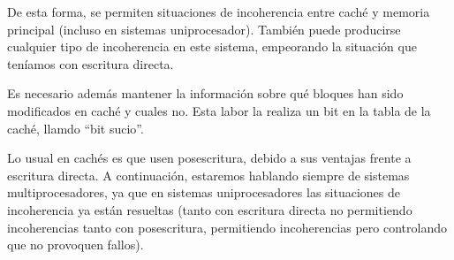 \begin{description}
        De esta forma, se permiten situaciones de incoherencia entre caché y memoria principal (incluso en sistemas uniprocesador). También puede producirse cualquier tipo de incoherencia en este sistema, empeorando la situación que teníamos con escritura directa.

        Es necesario además mantener la información sobre qué bloques han sido modificados en caché y cuales no. Esta labor la realiza un bit en la tabla de la caché, llamdo ``bit sucio''.
\end{description}
Lo usual en cachés es que usen posescritura, debido a sus ventajas frente a escritura directa. A continuación, estaremos hablando siempre de sistemas multiprocesadores, ya que en sistemas uniprocesadores las situaciones de incoherencia ya están resueltas (tanto con escritura directa no permitiendo incoherencias tanto con posescritura, permitiendo incoherencias pero controlando que no provoquen fallos).


